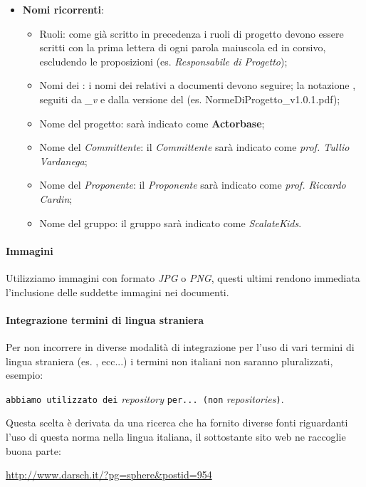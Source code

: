 \documentclass{scalatekids-article}
\begin{document}
\begin{itemize}
    \item \textbf{Nomi ricorrenti}:
        \begin{itemize}
            \item Ruoli: come già scritto in precedenza i ruoli di progetto devono essere scritti con la prima lettera di ogni parola maiuscola ed in corsivo, escludendo le proposizioni (es. \textit{Responsabile di Progetto});
            \item Nomi dei : i nomi dei  relativi a documenti devono seguire;
                la notazione \textit{}, seguiti da \textit{\_v} e dalla
                versione del  (es. NormeDiProgetto\_v1.0.1.pdf);
            \item Nome del progetto: sarà indicato come \textbf{Actorbase};
            \item Nome del \textit{Committente}: il \textit{Committente} sarà indicato come \textit{prof. Tullio Vardanega};
            \item Nome del \textit{Proponente}: il \textit{Proponente} sarà indicato come \textit{prof. Riccardo Cardin};
            \item Nome del gruppo: il gruppo sarà indicato come \textit{ScalateKids}.
        \end{itemize}
\end{itemize}

\paragraph{Immagini}

Utilizziamo immagini con formato \textit{JPG} o \textit{PNG}, questi ultimi rendono immediata l'inclusione delle suddette immagini nei documenti.

\paragraph{Integrazione termini di lingua straniera}

Per non incorrere in diverse modalità di integrazione per l'uso di vari termini di lingua straniera (es. ,  ecc...) i termini non italiani non saranno pluralizzati, esempio:\\
\begin{center}
    \verb=abbiamo utilizzato dei= \textit{repository} \verb=per... (non= \textit{repositories}\verb=)=.
\end{center}
Questa scelta è derivata da una ricerca che ha fornito diverse fonti riguardanti l'uso di questa norma nella lingua italiana, il sottostante sito web ne raccoglie buona parte:\\
\begin{center}
    \url{http://www.darsch.it/?pg=sphere&postid=954}
\end{center}
\end{document}

